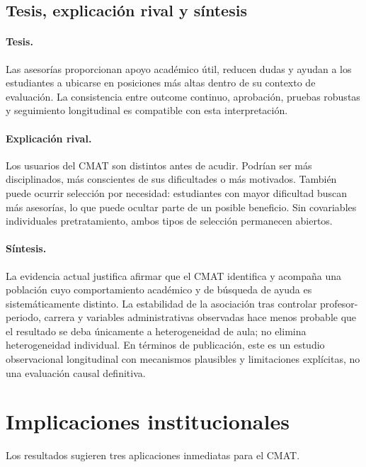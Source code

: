 \documentclass[11pt,letterpaper]{article}
\begin{document}
\subsection{Tesis, explicación rival y síntesis}

\paragraph{Tesis.} Las asesorías proporcionan apoyo académico útil, reducen dudas y ayudan a los estudiantes a ubicarse en posiciones más altas dentro de su contexto de evaluación. La consistencia entre outcome continuo, aprobación, pruebas robustas y seguimiento longitudinal es compatible con esta interpretación.

\paragraph{Explicación rival.} Los usuarios del CMAT son distintos antes de acudir. Podrían ser más disciplinados, más conscientes de sus dificultades o más motivados. También puede ocurrir selección por necesidad: estudiantes con mayor dificultad buscan más asesorías, lo que puede ocultar parte de un posible beneficio. Sin covariables individuales pretratamiento, ambos tipos de selección permanecen abiertos.

\paragraph{Síntesis.} La evidencia actual justifica afirmar que el CMAT identifica y acompaña una población cuyo comportamiento académico y de búsqueda de ayuda es sistemáticamente distinto. La estabilidad de la asociación tras controlar profesor-periodo, carrera y variables administrativas observadas hace menos probable que el resultado se deba únicamente a heterogeneidad de aula; no elimina heterogeneidad individual. En términos de publicación, este es un estudio observacional longitudinal con mecanismos plausibles y limitaciones explícitas, no una evaluación causal definitiva.

\section{Implicaciones institucionales}

Los resultados sugieren tres aplicaciones inmediatas para el CMAT.
\end{document}
